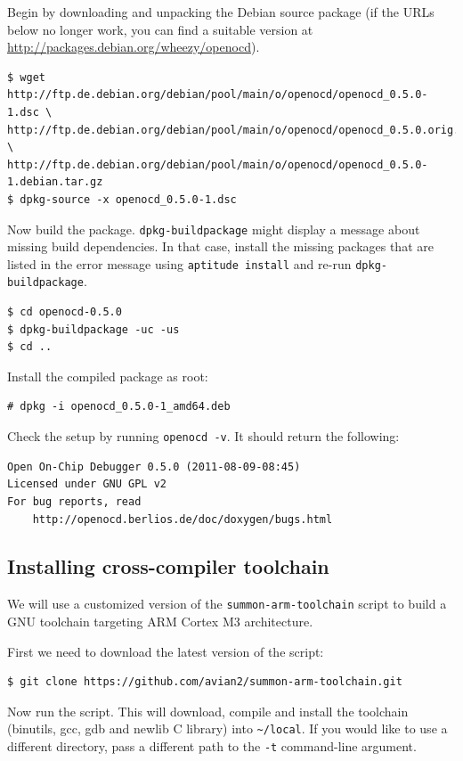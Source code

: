 \documentclass[a4paper, 10pt]{article}
\begin{document}
Begin by downloading and unpacking the Debian source package (if the URLs below
no longer work, you can find a suitable version at
\url{http://packages.debian.org/wheezy/openocd}).

\begin{verbatim}
$ wget http://ftp.de.debian.org/debian/pool/main/o/openocd/openocd_0.5.0-1.dsc \
http://ftp.de.debian.org/debian/pool/main/o/openocd/openocd_0.5.0.orig.tar.bz2 \
http://ftp.de.debian.org/debian/pool/main/o/openocd/openocd_0.5.0-1.debian.tar.gz
$ dpkg-source -x openocd_0.5.0-1.dsc
\end{verbatim}

Now build the package. \verb|dpkg-buildpackage| might display a message about
missing build dependencies. In that case, install the missing packages that are
listed in the error message using \verb|aptitude install| and re-run
\verb|dpkg-buildpackage|.

\begin{verbatim}
$ cd openocd-0.5.0
$ dpkg-buildpackage -uc -us
$ cd ..
\end{verbatim}

Install the compiled package as root:

\begin{verbatim}
# dpkg -i openocd_0.5.0-1_amd64.deb
\end{verbatim}

Check the setup by running \verb|openocd -v|. It should return the following:

\begin{verbatim}
Open On-Chip Debugger 0.5.0 (2011-08-09-08:45)
Licensed under GNU GPL v2
For bug reports, read
	http://openocd.berlios.de/doc/doxygen/bugs.html
\end{verbatim}

\subsection{Installing cross-compiler toolchain}

We will use a customized version of the \verb|summon-arm-toolchain| script to
build a GNU toolchain targeting ARM Cortex M3 architecture.

First we need to download the latest version of the script:

\begin{verbatim}
$ git clone https://github.com/avian2/summon-arm-toolchain.git
\end{verbatim}

Now run the script. This will download, compile and install the toolchain
(binutils, gcc, gdb and newlib C library) into \verb|~/local|. If you
would like to use a different directory, pass a different path to the
\verb|-t| command-line argument.
\end{document}
